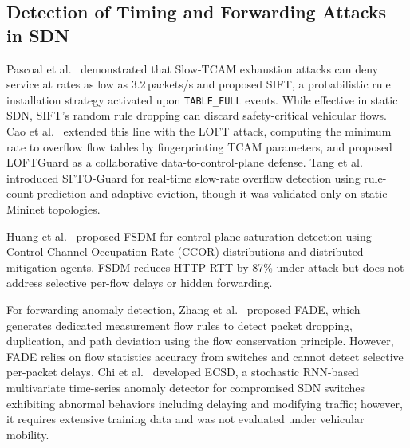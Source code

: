 \documentclass[12pt, a4paper]{report}
\begin{document}

\subsection{Detection of Timing and Forwarding Attacks in SDN}
\label{sec:attack_detection_sdn}

Pascoal et al.~\cite{Pascoal2017} demonstrated that Slow-TCAM exhaustion attacks can deny service at rates as low as 3.2\,packets/s and proposed SIFT, a probabilistic rule installation strategy activated upon \texttt{TABLE\_FULL} events. While effective in static SDN, SIFT's random rule dropping can discard safety-critical vehicular flows. Cao et al.~\cite{Cao2023LOFT} extended this line with the LOFT attack, computing the minimum rate to overflow flow tables by fingerprinting TCAM parameters, and proposed LOFTGuard as a collaborative data-to-control-plane defense. Tang et al.~\cite{Tang2023SFTO} introduced SFTO-Guard for real-time slow-rate overflow detection using rule-count prediction and adaptive eviction, though it was validated only on static Mininet topologies.

Huang et al.~\cite{Huang2020} proposed FSDM for control-plane saturation detection using Control Channel Occupation Rate (CCOR) distributions and distributed mitigation agents. FSDM reduces HTTP RTT by 87\% under attack but does not address selective per-flow delays or hidden forwarding.

For forwarding anomaly detection, Zhang et al.~\cite{Zhang2021FADE} proposed FADE, which generates dedicated measurement flow rules to detect packet dropping, duplication, and path deviation using the flow conservation principle. However, FADE relies on flow statistics accuracy from switches and cannot detect selective per-packet delays. Chi et al.~\cite{Chi2020} developed ECSD, a stochastic RNN-based multivariate time-series anomaly detector for compromised SDN switches exhibiting abnormal behaviors including delaying and modifying traffic; however, it requires extensive training data and was not evaluated under vehicular mobility.
\end{document}
